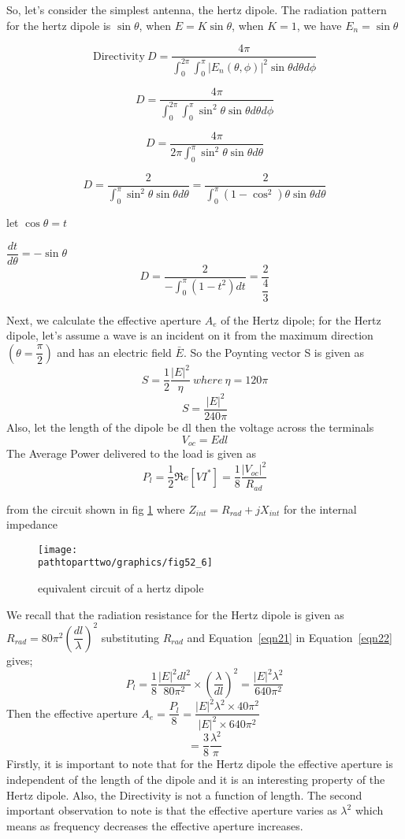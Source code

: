 So, let's consider the simplest antenna, the hertz dipole. The radiation pattern for the hertz dipole is $\sin\theta$, when $E=K\sin\theta$, when $K=1$, we have $E_{n}=\sin\theta$

$$\text{Directivity} \ D=\dfrac{4\pi}{\int_{0}^{2\pi}\int_{0}^{\pi}|E_n(\theta , \phi)|^{2} \sin\theta d\theta d\phi}$$

$$ D=\dfrac{4\pi}{\int_{0}^{2\pi}\int_{0}^{\pi}\sin^{2}\theta \sin\theta d\theta d\phi}$$

$$ D=\dfrac{4\pi}{2\pi\int_{0}^{\pi}\sin^{2}\theta \sin\theta d\theta}$$

$$ D=\dfrac{2}{\int_{0}^{\pi}\sin^{2}\theta \sin\theta d\theta} = \dfrac{2}{\int_{0}^{\pi}(1-\cos^{2})\theta \sin\theta d\theta} $$

let $\cos\theta = t$

$\dfrac{dt}{d\theta}=-\sin\theta$
$$ D=\dfrac{2}{-\int_{0}^{\pi}(1-t^{2})dt} = \dfrac{2}{\dfrac{4}{3}} $$

Next, we calculate the effective aperture $A_{e}$ of the Hertz dipole; for the Hertz dipole, let's assume a wave is an incident on it from the maximum direction $(\theta=\dfrac{\pi}{2})$ and has an electric field $\bar{E}$. So the Poynting vector S is given as 
$$ S= \dfrac{1}{2}\dfrac{|E|^{{2}}}{\eta} \ where \  \eta =120\pi$$
$$ S= \dfrac{|E|^{{2}}}{240\pi}$$
Also, let the length of the dipole be dl then the voltage across the terminals
\begin{equation}
V_{oc}=Edl
\label{eqn21}
\end{equation}
The Average Power delivered to the load is given as
\begin{equation}
P_{l}=\dfrac{1}{2}\Re e [VI^{*}]=\dfrac{1}{8}\dfrac{|V_{oc}|^{2}}{R_{ad}}
\label{eqn22}
\end{equation}

from the circuit shown in fig \ref{fig6} where $Z_{int}=R_{rad}+jX_{int} $ for the internal impedance 
\begin{figure}[h]
\centering
\texttt{[image: \\pathtoparttwo/graphics/fig52\_6]}
\caption{equivalent circuit of a hertz dipole}
\label{fig6}	
\end{figure}

We recall that the radiation resistance for the Hertz dipole is given as $R_{rad}=80\pi^{2}(\dfrac{dl}{\lambda})^{2}$ substituting $R_{rad}$ and Equation~\ref{eqn21} in Equation~\ref{eqn22} gives; 
$$	P_{l}=\dfrac{1}{8}\dfrac{|E|^{2}dl^{2}}{80\pi^{2}}\times\left(\dfrac{\lambda}{dl}\right)^{2}= \dfrac{|E|^{2}\lambda^{2}}{640\pi^{2}}$$
Then the effective aperture $A_{e}=\dfrac{P_{l}}{8}=\dfrac{|E|^{2}\lambda^{2}\times40\pi^{2}}{|E|^{2}\times640\pi^{2}}$
$$=\dfrac{3}{8}\dfrac{\lambda^{2}}{\pi}$$
Firstly, it is important to note that for the Hertz dipole the effective aperture is independent of the length of the dipole and it is an interesting property of the Hertz dipole. Also, the Directivity is not a function of length. The second important observation to note is that the effective aperture varies as $\lambda^{2}$ which means as frequency decreases the effective aperture increases.


